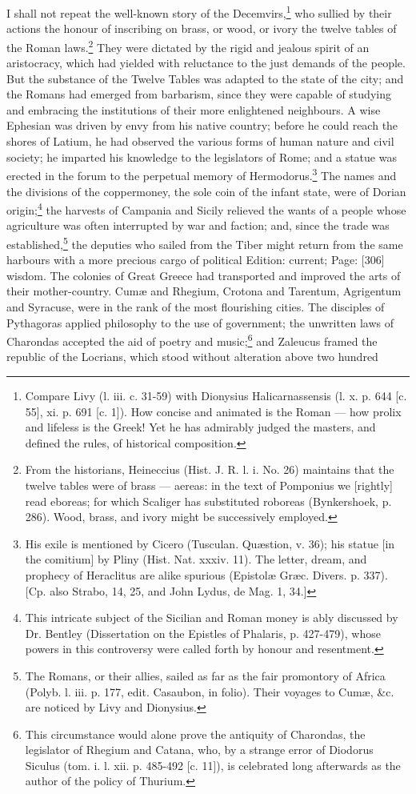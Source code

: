 I shall not repeat the well-known story of the Decemvirs,\footnote{Compare Livy (l. iii. c. 31-59) with Dionysius Halicarnassensis (l. x. p. 644 [c. 55], xi. p. 691 [c. 1]). How concise and animated is the Roman \texthebrew{—} how prolix and lifeless is the Greek! Yet he has admirably judged the masters, and defined the rules, of historical composition.} who sullied by their actions the honour of inscribing on brass, or wood, or ivory the twelve tables of the Roman laws.\footnote{From the historians, Heineccius (Hist. J. R. l. i. No. 26) maintains that the twelve tables were of brass \texthebrew{—} aereas: in the text of Pomponius we [rightly] read eboreas; for which Scaliger has substituted roboreas (Bynkershoek, p. 286). Wood, brass, and ivory might be successively employed.} They were dictated by the rigid and jealous spirit of an aristocracy, which had yielded with reluctance to the just demands of the people. But the substance of the Twelve Tables was adapted to the state of the city; and the Romans had emerged from barbarism, since they were capable of studying and embracing the institutions of their more enlightened neighbours. A wise Ephesian was driven by envy from his native country; before he could reach the shores of Latium, he had observed the various forms of human nature and civil society; he imparted his knowledge to the legislators of Rome; and a statue was erected in the forum to the perpetual memory of Hermodorus.\footnote{His exile is mentioned by Cicero (Tusculan. Quæstion, v. 36); his statue [in the comitium] by Pliny (Hist. Nat. xxxiv. 11). The letter, dream, and prophecy of Heraclitus are alike spurious (Epistolæ Græc. Divers. p. 337). [Cp. also Strabo, 14, 25, and John Lydus, de Mag. 1, 34.]} The names and the divisions of the coppermoney, the sole coin of the infant state, were of Dorian origin;\footnote{This intricate subject of the Sicilian and Roman money is ably discussed by Dr. Bentley (Dissertation on the Epistles of Phalaris, p. 427-479), whose powers in this controversy were called forth by honour and resentment.} the harvests of Campania and Sicily relieved the wants of a people whose agriculture was often interrupted by war and faction; and, since the trade was established,\footnote{The Romans, or their allies, sailed as far as the fair promontory of Africa (Polyb. l. iii. p. 177, edit. Casaubon, in folio). Their voyages to Cumæ, \&c. are noticed by Livy and Dionysius.} the deputies who sailed from the Tiber might return from the same harbours with a more precious cargo of political Edition: current; Page: [306] wisdom. The colonies of Great Greece had transported and improved the arts of their mother-country. Cumæ and Rhegium, Crotona and Tarentum, Agrigentum and Syracuse, were in the rank of the most flourishing cities. The disciples of Pythagoras applied philosophy to the use of government; the unwritten laws of Charondas accepted the aid of poetry and music;\footnote{This circumstance would alone prove the antiquity of Charondas, the legislator of Rhegium and Catana, who, by a strange error of Diodorus Siculus (tom. i. l. xii. p. 485-492 [c. 11]), is celebrated long afterwards as the author of the policy of Thurium.} and Zaleucus framed the republic of the Locrians, which stood without alteration above two hundred 